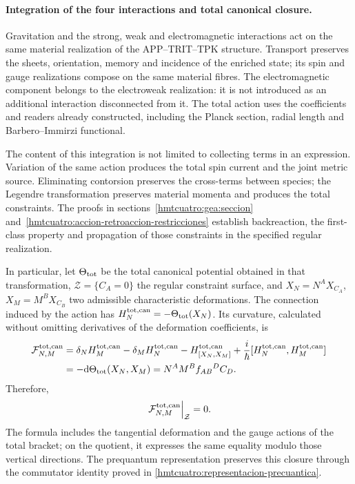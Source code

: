 \paragraph{Integration of the four interactions and total canonical closure.}
Gravitation and the strong, weak and electromagnetic interactions act on the same material realization of the APP--TRIT--TPK structure. Transport preserves the sheets, orientation, memory and incidence of the enriched state; its spin and gauge realizations compose on the same material fibres. The electromagnetic component belongs to the electroweak realization: it is not introduced as an additional interaction disconnected from it. The total action uses the coefficients and readers already constructed, including the Planck section, radial length and Barbero--Immirzi functional.

The content of this integration is not limited to collecting terms in an expression. Variation of the same action produces the total spin current and the joint metric source. Eliminating contorsion preserves the cross-terms between species; the Legendre transformation preserves material momenta and produces the total constraints. The proofs in sections~\ref{hmtcuatro:gea:seccion} and~\ref{hmtcuatro:accion-retroaccion-restricciones} establish backreaction, the first-class property and propagation of those constraints in the specified regular realization.

In particular, let $\Theta_{\rm tot}$ be the total canonical potential obtained in that transformation, $\mathcal Z=\{C_A=0\}$ the regular constraint surface, and $X_N=N^AX_{C_A}$, $X_M=M^BX_{C_B}$ two admissible characteristic deformations. The connection induced by the action has $H_N^{\rm tot,can}=-\Theta_{\rm tot}(X_N)$. Its curvature, calculated without omitting derivatives of the deformation coefficients, is
\begin{equation}
\begin{aligned}
\mathcal F^{\rm tot,can}_{N,M}
&=\delta_NH_M^{\rm tot,can}-\delta_MH_N^{\rm tot,can}
 -H_{[X_N,X_M]}^{\rm tot,can}
 +\frac{i}{\hbar}[H_N^{\rm tot,can},H_M^{\rm tot,can}]\\
&=-\mathrm d\Theta_{\rm tot}(X_N,X_M)
 =N^AM^B f_{AB}{}^{D}C_D.
\end{aligned}
\label{hmtcuatro:conclusion-curvatura-total}
\end{equation}
Therefore,
\[
 \left.\mathcal F^{\rm tot,can}_{N,M}\right|_{\mathcal Z}=0.
\]
The formula includes the tangential deformation and the gauge actions of the total bracket; on the quotient, it expresses the same equality modulo those vertical directions. The prequantum representation preserves this closure through the commutator identity proved in \eqref{hmtcuatro:representacion-precuantica}.

